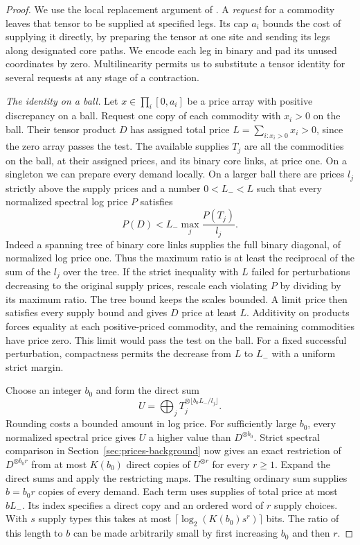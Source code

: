 \begin{proof}
We use the local replacement argument of
\cite[Section~]{oaG}. A \emph{request} for a
commodity leaves that tensor to be supplied at specified legs.
Its cap $a_i$ bounds the cost of supplying it directly, by preparing
the tensor at one site and sending its legs along designated core
paths. We encode each leg in binary and pad its unused coordinates
by zero. Multilinearity permits us to substitute a tensor identity
for several requests at any stage of a contraction.

\smallskip\noindent
\emph{The identity on a ball.}
Let $x\in\prod_i[0,a_i]$ be a price array with positive discrepancy on
a ball. Request one copy of each commodity with $x_i>0$ on the ball.
Their tensor product $D$ has assigned total price $L=\sum_{i:x_i>0}x_i>0$,
since the zero array passes the test. The available supplies $T_j$
are all the commodities on the ball, at their assigned prices, and
its binary core links, at price one. On a singleton we can prepare
every demand locally. On a larger ball there are prices $l_j$ strictly
above the supply prices and a number $0<L_-<L$ such that every
normalized spectral log price $P$ satisfies
\[
                 P(D)<L_-\max_j\frac{P(T_j)}{l_j}.
\]
Indeed a spanning tree of binary core links supplies the full binary
diagonal, of normalized log price one. Thus the maximum ratio is at
least the reciprocal of the sum of the $l_j$ over the tree. If the
strict inequality with $L$ failed for perturbations decreasing to
the original supply prices, rescale each violating $P$ by dividing
by its maximum ratio. The tree bound keeps the scales bounded.
A limit price then satisfies every supply bound and gives $D$ price
at least $L$. Additivity on products forces equality at each
positive-priced commodity, and the remaining commodities have price
zero. This limit would pass the test on the ball. For a fixed
successful perturbation, compactness permits the decrease from $L$
to $L_-$ with a uniform strict margin.

Choose an integer $b_0$ and form the direct sum
\[
               U=\bigoplus_j T_j^{\otimes\lfloor b_0L_-/l_j\rfloor}.
\]
Rounding costs a bounded amount in log price. For sufficiently large
$b_0$, every normalized spectral price gives $U$ a higher value than
$D^{\otimes b_0}$. Strict spectral comparison in
Section~\ref{sec:prices-background} now gives an exact restriction of
$D^{\otimes b_0r}$ from at most $K(b_0)$ direct copies of
$U^{\otimes r}$ for every $r\ge1$. Expand the direct sums and apply
the restricting maps. The resulting ordinary sum supplies $b=b_0r$
copies of every demand. Each term uses supplies of total price at
most $bL_-$. Its index specifies a direct copy and an ordered word
of $r$ supply choices. With $s$ supply types this takes at most
$\lceil\log_2(K(b_0)s^r)\rceil$ bits. The ratio of this length to
$b$ can be made arbitrarily small by first increasing $b_0$ and then
$r$.


\end{proof}
